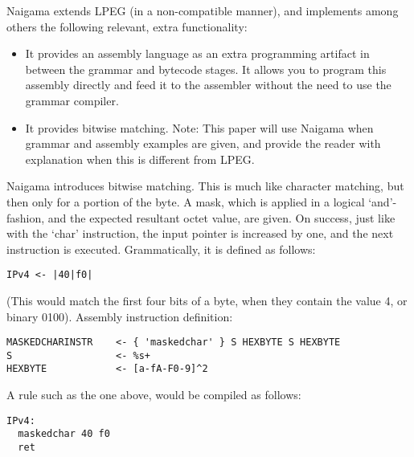 Naigama extends LPEG (in a non-compatible manner), and implements among 
others the following relevant, extra functionality:
\begin{itemize}
    \item It provides an assembly language as an extra programming artifact 
in between the grammar and bytecode stages. It allows you to program this 
assembly directly and feed it to the assembler without the need to use the 
grammar compiler.
    \item It provides bitwise matching.
Note: This paper will use Naigama when grammar and assembly examples are 
given, and provide the reader with explanation when this is different from 
LPEG.
\end{itemize}


Naigama introduces bitwise matching. This is much like character matching, 
but then only for a portion of the byte. A mask, which is applied in a 
logical ‘and’-fashion, and the expected resultant octet value, are 
given. On success, just like with the ‘char’ instruction, the input 
pointer is increased by one, and the next instruction is executed. 
Grammatically, it is defined as follows:

\begin{changemargin}{-60mm}{0mm}
\begin{myquote}
\begin{verbatim}
IPv4 <- |40|f0|
\end{verbatim}
\end{myquote}
\end{changemargin}

(This would match the first four bits of a byte, when they contain the 
value 4, or binary 0100).
Assembly instruction definition:

\begin{changemargin}{-60mm}{0mm}
\begin{myquote}
\begin{verbatim}
MASKEDCHARINSTR    <- { 'maskedchar' } S HEXBYTE S HEXBYTE
S                  <- %s+
HEXBYTE            <- [a-fA-F0-9]^2
\end{verbatim}
\end{myquote}
\end{changemargin}

A rule such as the one above, would be compiled as follows:

\begin{changemargin}{-60mm}{0mm}
\begin{myquote}
\begin{verbatim}
IPv4:
  maskedchar 40 f0
  ret
\end{verbatim}
\end{myquote}
\end{changemargin}

